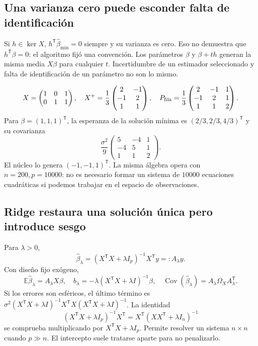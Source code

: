 \documentclass[11pt,a4paper]{article}
\newcommand{\E}{\mathbb E}
\newcommand{\T}{^{\mathsf T}}
\DeclareMathOperator{\Cov}{Cov}
\DeclareMathOperator{\kerop}{ker}
\theoremstyle{definition}
\begin{document}
\subsection{Una varianza cero puede esconder falta de identificación}
Si $h\in\kerop X$, $h\T\widehat\beta_{\min}=0$ siempre y su varianza es cero. Eso no demuestra que $h\T\beta=0$: el algoritmo fijó una convención. Los parámetros $\beta$ y $\beta+th$ generan la misma media $X\beta$ para cualquier $t$. Incertidumbre de un estimador seleccionado y falta de identificación de un parámetro no son lo mismo.
\begin{ejemplo}
\[
X=\begin{pmatrix}1&0&1\\0&1&1\end{pmatrix},\quad
X^+=\frac13\begin{pmatrix}2&-1\\-1&2\\1&1\end{pmatrix},\quad
P_{\rm fila}=\frac13\begin{pmatrix}2&-1&1\\-1&2&1\\1&1&2\end{pmatrix}.
\]
Para $\beta=(1,1,1)\T$, la esperanza de la solución mínima es $(2/3,2/3,4/3)\T$ y su covarianza
\[
\frac{\sigma^2}{9}\begin{pmatrix}5&-4&1\\-4&5&1\\1&1&2\end{pmatrix}.
\]
El núcleo lo genera $(-1,-1,1)\T$. La misma álgebra opera con $n=200,p=10000$: no es necesario formar un sistema de $10000$ ecuaciones cuadráticas si podemos trabajar en el espacio de observaciones.
\end{ejemplo}
\subsection{Ridge restaura una solución única pero introduce sesgo}
Para $\lambda>0$,
\[
\widehat\beta_\lambda=(X\T X+\lambda I_p)^{-1}X\T y=:A_\lambda y.
\]
Con diseño fijo exógeno,
\[
\E\widehat\beta_\lambda=A_\lambda X\beta,
\quad b_\lambda=-\lambda(X\T X+\lambda I)^{-1}\beta,
\quad\Cov(\widehat\beta_\lambda)=A_\lambda\Omega_XA_\lambda\T.
\]
Si los errores son esféricos, el último término es $\sigma^2(X\T X+\lambda I)^{-1}X\T X(X\T X+\lambda I)^{-1}$. La identidad
\[
(X\T X+\lambda I_p)^{-1}X\T=X\T(XX\T+\lambda I_n)^{-1}
\]
se comprueba multiplicando por $X\T X+\lambda I_p$. Permite resolver un sistema $n\times n$ cuando $p\gg n$. El intercepto suele tratarse aparte para no penalizarlo.
\end{document}
